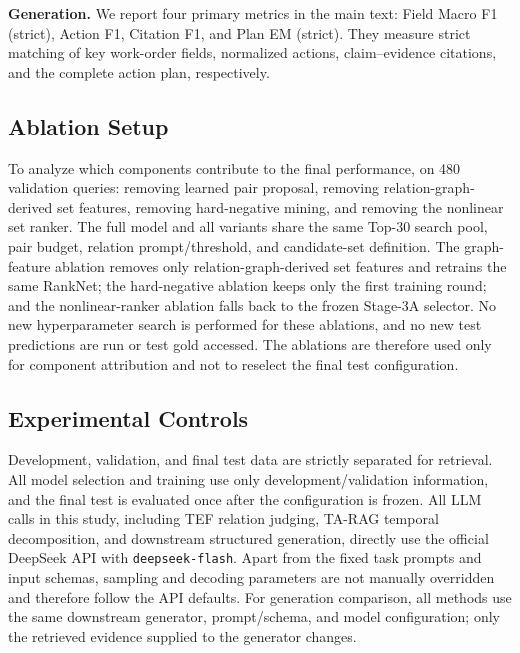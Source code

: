 \textbf{Generation.}
We report four primary metrics in the main text: Field Macro F1 (strict), Action F1, Citation F1, and Plan EM (strict). They measure strict matching of key work-order fields, normalized actions, claim--evidence citations, and the complete action plan, respectively.

\subsection{Ablation Setup}

To analyze which components contribute to the final performance,  on 480 validation queries: removing learned pair proposal, removing relation-graph-derived set features, removing hard-negative mining, and removing the nonlinear set ranker. The full model and all variants share the same Top-30 search pool, pair budget, relation prompt/threshold, and candidate-set definition. The graph-feature ablation removes only relation-graph-derived set features and retrains the same RankNet; the hard-negative ablation keeps only the first training round; and the nonlinear-ranker ablation falls back to the frozen Stage-3A selector. No new hyperparameter search is performed for these ablations, and no new test predictions are run or test gold accessed. The ablations are therefore used only for component attribution and not to reselect the final test configuration.

\subsection{Experimental Controls}

Development, validation, and final test data are strictly separated for retrieval. All model selection and training use only development/validation information, and the final test is evaluated once after the configuration is frozen.
All LLM calls in this study, including TEF relation judging, TA-RAG temporal decomposition, and downstream structured generation, directly use the official DeepSeek API with \texttt{deepseek-flash}. Apart from the fixed task prompts and input schemas, sampling and decoding parameters are not manually overridden and therefore follow the API defaults.
For generation comparison, all methods use the same downstream generator, prompt/schema, and model configuration; only the retrieved evidence supplied to the generator changes. %
